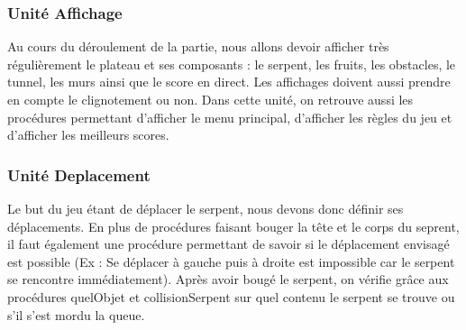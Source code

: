 \documentclass[11pt,a4paper]{article}
\begin{document}
        \subsubsection{Unité Affichage}
        
         Au cours du déroulement de la partie, nous allons devoir afficher très régulièrement le plateau et ses composants : le serpent, les fruits, les obstacles, le tunnel, les murs ainsi que le score en direct. Les affichages doivent aussi prendre en compte le clignotement ou non. Dans cette unité, on retrouve aussi les procédures permettant d'afficher le menu principal, d'afficher les règles du jeu et d'afficher les meilleurs scores.
       
        
        \begin{algorithm}
        \end{algorithm}     
        
        \subsubsection{Unité Deplacement}
        
         Le but du jeu étant de déplacer le serpent, nous devons donc définir ses déplacements. En plus de procédures faisant bouger la tête et le corps du seprent, il faut également une procédure permettant de savoir si le déplacement envisagé est possible (Ex : Se déplacer à gauche puis à droite est impossible car le serpent se rencontre immédiatement). Après avoir bougé le serpent, on vérifie grâce aux procédures quelObjet et collisionSerpent sur quel contenu le serpent se trouve ou s'il s'est mordu la queue.
        
        \begin{algorithm}
        \end{algorithm}
        
\end{document}
